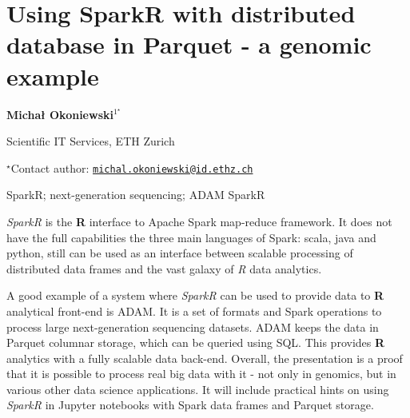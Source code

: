 
\pagestyle{empty}

\section{Using SparkR with distributed database in Parquet - a genomic example}

\begin{center}
  {\bf Michał Okoniewski$^{1^\star}$}
\end{center}

\vskip 0.3cm

\begin{affiliations}
\begin{enumerate}
\begin{minipage}{0.915\textwidth}
\centering
\item Scientific IT Services, ETH Zurich \\[-2pt]
\end{minipage}
\end{enumerate}
$^\star$Contact author: \href{mailto:michal.okoniewski@id.ethz.ch}{\nolinkurl{michal.okoniewski@id.ethz.ch}}\\
\end{affiliations}

\vskip 0.5cm

\begin{minipage}{0.915\textwidth}
\keywords SparkR; next-generation sequencing; ADAM
\packages SparkR
\end{minipage}

\vskip 0.8cm

\emph{SparkR} is the \textbf{R} interface to Apache Spark map-reduce
framework. It does not have the full capabilities the three main
languages of Spark: scala, java and python, still can be used as an
interface between scalable processing of distributed data frames and the
vast galaxy of \emph{R} data analytics.

A good example of a system where \emph{SparkR} can be used to provide
data to \textbf{R} analytical front-end is ADAM. It is a set of formats
and Spark operations to process large next-generation sequencing
datasets. ADAM keeps the data in Parquet columnar storage, which can be
queried using SQL. This provides \textbf{R} analytics with a fully
scalable data back-end. Overall, the presentation is a proof that it is
possible to process real big data with it - not only in genomics, but in
various other data science applications. It will include practical hints
on using \emph{SparkR} in Jupyter notebooks with Spark data frames and
Parquet storage.


